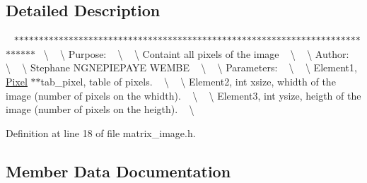 \subsection{Detailed Description}
~\newline
$\ast$$\ast$$\ast$$\ast$$\ast$$\ast$$\ast$$\ast$$\ast$$\ast$$\ast$$\ast$$\ast$$\ast$$\ast$$\ast$$\ast$$\ast$$\ast$$\ast$$\ast$$\ast$$\ast$$\ast$$\ast$$\ast$$\ast$$\ast$$\ast$$\ast$$\ast$$\ast$$\ast$$\ast$$\ast$$\ast$$\ast$$\ast$$\ast$$\ast$$\ast$$\ast$$\ast$$\ast$$\ast$$\ast$$\ast$$\ast$$\ast$$\ast$$\ast$$\ast$$\ast$$\ast$$\ast$$\ast$$\ast$$\ast$$\ast$$\ast$$\ast$$\ast$$\ast$$\ast$$\ast$$\ast$$\ast$$\ast$$\ast$$\ast$$\ast$$\ast$$\ast$$\ast$$\ast$$\ast$~\newline
 \textbackslash{} ~\newline
\textbackslash{} Purpose\+: ~\newline
\textbackslash{} ~\newline
\textbackslash{} Containt all pixels of the image ~\newline
\textbackslash{} ~\newline
\textbackslash{} Author\+: ~\newline
\textbackslash{} ~\newline
\textbackslash{} Stephane N\+G\+N\+E\+P\+I\+E\+P\+A\+YE W\+E\+M\+BE ~\newline
\textbackslash{} ~\newline
\textbackslash{} Parameters\+: ~\newline
\textbackslash{} ~\newline
\textbackslash{} Element1, \hyperlink{class_pixel}{Pixel} $\ast$$\ast$tab\+\_\+pixel, table of pixels. ~\newline
\textbackslash{} ~\newline
\textbackslash{} Element2, int xsize, whidth of the image (number of pixels on the whidth). ~\newline
\textbackslash{} ~\newline
\textbackslash{} Element3, int ysize, heigth of the image (number of pixels on the heigth). ~\newline
\textbackslash{} ~\newline


Definition at line 18 of file matrix\+\_\+image.\+h.



\subsection{Member Data Documentation}
\mbox{\label{struct_matrix__image_a9276f0a4813f51d635278d661d5d4185}} 
